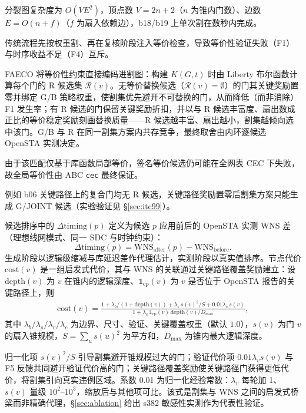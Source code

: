 \documentclass[journal]{IEEEtran}
\begin{document}
分裂图复杂度为 $O(VE^2)$，顶点数 $V=2n+2$（$n$ 为锥内门数）、边数 $E=O(n+f)$（$f$ 为扇入依赖边），b18/b19 上单次割在数秒内完成。

传统流程先按权重割、再在复核阶段注入等价检查，导致等价性验证失败（F1）与时序收益不足（F4）互斥。

FAECO 将等价性约束直接编码进割图：构建 $K(G, t)$ 时由 Liberty 布尔函数计算每个门的 R 候选集 $\mathcal{R}(v)$。无等价替换候选（$\mathcal{R}(v)=\emptyset$）的门其关键奖励置零并绑定 G/B 策略权重，使割集优先避开不可替换的门，从而降低（而非消除）F1 发生率；有 R 候选的门保留关键奖励折扣，并以与 R 候选丰富度、扇出数成正比的等价稳定奖励刻画替换质量——R 候选越丰富、扇出越小，割集越倾向选中该门。G/B 与 R 在同一割集方案内共存竞争，最终取舍由内环逐候选 OpenSTA 实测决定。

由于该匹配仅基于库函数局部等价，签名等价候选仍可能在全网表 CEC 下失败，故全局等价性由 ABC \texttt{cec} 最终保证。

例如 b06 关键路径上的复合门均无 R 候选，关键路径奖励置零后割集方案只能生成 G/JOINT 候选（实验验证见 \S\ref{sec:itc99}）。

候选排序中的 $\Delta\mathrm{timing}(p)$ 定义为候选 $p$ 应用前后的 OpenSTA 实测 WNS 差（理想线网模式、同一 SDC 与时钟约束）：
\begin{equation}\label{eq:dtiming}
\Delta\mathrm{timing}(p) = \mathrm{WNS}_{\mathrm{after}}(p) - \mathrm{WNS}_{\mathrm{before}}.
\end{equation}
生成阶段以逻辑级缩减与库延迟差作代理估计，实测阶段以真实值排序。节点代价 $\mathrm{cost}(v)$ 是一组启发式代价，其与 WNS 的关联通过关键路径覆盖奖励建立：设 $\mathrm{depth}(v)$ 为 $v$ 在锥内的逻辑深度、$\mathbb{1}_{\mathrm{cp}}(v)$ 为 $v$ 是否位于 OpenSTA 报告的关键路径上，则
{\small
\begin{equation}
\label{eq:cost}
\begin{split}
\mathrm{cost}(v) = \frac{1 + \lambda_b/(1+\mathrm{depth}(v)) + \lambda_s\,s(v)^2/S + 0.01\lambda_v\,s(v)}{1 + \lambda_c\,\mathbb{1}_{\mathrm{cp}}(v)\,\mathrm{depth}(v)/D_{\max}},
\end{split}
\end{equation}
}
其中 $\lambda_b/\lambda_s/\lambda_v/\lambda_c$ 为边界、尺寸、验证、关键覆盖权重（默认 $1.0$），$s(v)$ 为门 $v$ 的扇入锥规模，$S=\sum_u s(u)^2$ 为平方和，$D_{\max}$ 为锥内最大逻辑深度。

归一化项 $s(v)^2/S$ 引导割集避开锥规模过大的门；验证代价项 $0.01\lambda_v s(v)$ 与 F5 反馈共同避开验证代价高的门；关键路径覆盖奖励使关键路径门获得更低代价，将割集引向真实违例区域。系数 0.01 为归一化经验常数：$\lambda_v$ 每轮加 1、$s(v)$ 量级 $10^2$--$10^3$，缩放后与其他项可比。该式是割集与 WNS 之间的启发式桥梁而非精确代理，\S\ref{sec:ablation} 给出 s382 敏感性实测作为代表性验证。
\end{document}
